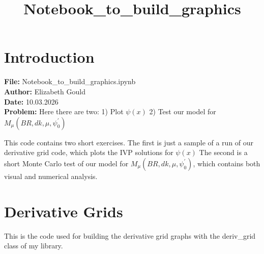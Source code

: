 \documentclass[11pt]{article}
\title{Notebook\_to\_build\_graphics}
\begin{document}
    
    \maketitle
    
    

    
    \hypertarget{introduction}{%
\section{Introduction}\label{introduction}}

    \textbf{File:} Notebook\_to\_build\_graphics.ipynb\\
\textbf{Author:} Elizabeth Gould\\
\textbf{Date:} 10.03.2026\\
\textbf{Problem:} Here there are two: 1) Plot \(\psi(x)\) 2) Test our
model for \(M_{\mu}\left(BR, dk, \mu, \psi_0^\prime\right)\)

    This code contains two short exercises. The first is just a sample of a
run of our derivative grid code, which plots the IVP solutions for
\(\psi(x)\) The second is a short Monte Carlo test of our model for
\(M_{\mu}\left(BR, dk, \mu, \psi_0^\prime\right)\), which contains both
visual and numerical analysis.

    \hypertarget{derivative-grids}{%
\section{Derivative Grids}\label{derivative-grids}}

    This is the code used for building the derivative grid graphs with the
deriv\_grid class of my library.
\end{document}

